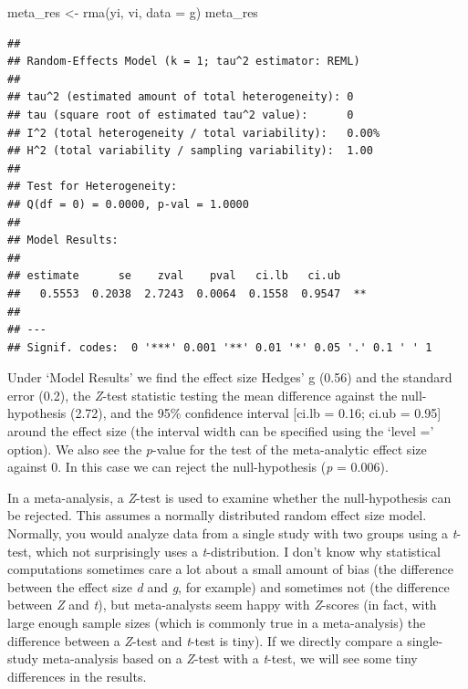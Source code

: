 \documentclass[
  oneside]{krantz}
\makeatletter
\newenvironment{Shaded}{\begin{snugshade}}{\end{snugshade}}
\newcommand{\AttributeTok}[1]{\textcolor[rgb]{0.61,0.61,0.61}{#1}}
\newcommand{\FunctionTok}[1]{\textcolor[rgb]{0,0,0}{#1}}
\newcommand{\NormalTok}[1]{#1}
\newcommand{\OtherTok}[1]{\textcolor[rgb]{0.37,0.37,0.37}{#1}}
\newenvironment{kframe}{%
\medskip{}
\setlength{\fboxsep}{.8em}
 \def\at@end@of@kframe{}%
 \ifinner\ifhmode%
  \def\at@end@of@kframe{\end{minipage}}%
  \begin{minipage}{\columnwidth}%
 \fi\fi%
 \def\FrameCommand##1{\hskip\@totalleftmargin \hskip-\fboxsep
 \colorbox{shadecolor}{##1}\hskip-\fboxsep
     \hskip-\linewidth \hskip-\@totalleftmargin \hskip\columnwidth}%
 \MakeFramed {\advance\hsize-\width
   \@totalleftmargin\z@ \linewidth\hsize
   \@setminipage}}%
 {\par\unskip\endMakeFramed%
 \at@end@of@kframe}
\renewenvironment{Shaded}{\begin{kframe}}{\end{kframe}}
\makeatother
\begin{document}
\begin{Shaded}
\begin{Highlighting}[]
\NormalTok{meta\_res }\OtherTok{\textless{}{-}} \FunctionTok{rma}\NormalTok{(yi, vi, }\AttributeTok{data =}\NormalTok{ g)}
\NormalTok{meta\_res}
\end{Highlighting}
\end{Shaded}

\begin{verbatim}
## 
## Random-Effects Model (k = 1; tau^2 estimator: REML)
## 
## tau^2 (estimated amount of total heterogeneity): 0
## tau (square root of estimated tau^2 value):      0
## I^2 (total heterogeneity / total variability):   0.00%
## H^2 (total variability / sampling variability):  1.00
## 
## Test for Heterogeneity:
## Q(df = 0) = 0.0000, p-val = 1.0000
## 
## Model Results:
## 
## estimate      se    zval    pval   ci.lb   ci.ub    ​ 
##   0.5553  0.2038  2.7243  0.0064  0.1558  0.9547  ** 
## 
## ---
## Signif. codes:  0 '***' 0.001 '**' 0.01 '*' 0.05 '.' 0.1 ' ' 1
\end{verbatim}

Under `Model Results' we find the effect size Hedges' g (0.56) and the standard error (0.2), the \emph{Z}-test statistic testing the mean difference against the null-hypothesis (2.72), and the 95\% confidence interval {[}ci.lb = 0.16; ci.ub = 0.95{]} around the effect size (the interval width can be specified using the `level =' option). We also see the \emph{p}-value for the test of the meta-analytic effect size against 0. In this case we can reject the null-hypothesis (\emph{p} = 0.006).

In a meta-analysis, a \emph{Z}-test is used to examine whether the null-hypothesis can be rejected. This assumes a normally distributed random effect size model. Normally, you would analyze data from a single study with two groups using a \emph{t}-test, which not surprisingly uses a \emph{t}-distribution. I don't know why statistical computations sometimes care a lot about a small amount of bias (the difference between the effect size \emph{d} and \emph{g}, for example) and sometimes not (the difference between \emph{Z} and \emph{t}), but meta-analysts seem happy with \emph{Z}-scores (in fact, with large enough sample sizes (which is commonly true in a meta-analysis) the difference between a \emph{Z}-test and \emph{t}-test is tiny). If we directly compare a single-study meta-analysis based on a \emph{Z}-test with a \emph{t}-test, we will see some tiny differences in the results.
\end{document}
